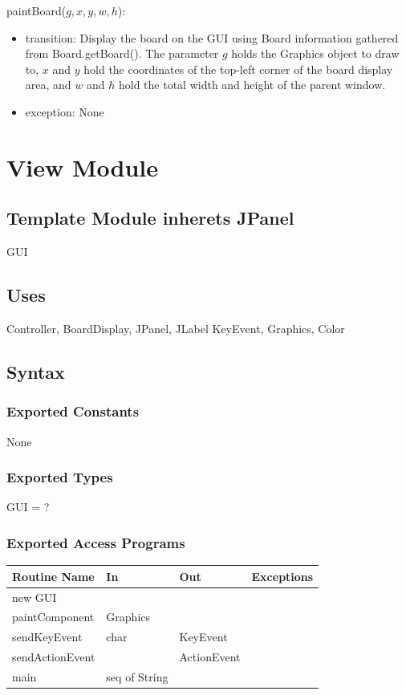 \documentclass{article}
\begin{document}
			\noindent paintBoard($g,x,y,w,h$):
			\begin{itemize}
				\item transition: Display the board on the GUI using Board information gathered from Board.getBoard(). The parameter $g$ holds the Graphics object to draw to, $x$ and $y$ hold the coordinates of the top-left corner of the board display area, and $w$ and $h$ hold the total width and height of the parent window.
				\item exception: None
			\end{itemize}


\newpage

\section*{View Module}
	
	\subsection*{Template Module inherets JPanel}
		GUI

	\subsection*{Uses}
		Controller, BoardDisplay, JPanel, JLabel KeyEvent, Graphics, Color

	\subsection*{Syntax}

		\subsubsection*{Exported Constants}
			None

		\subsubsection*{Exported Types}
			GUI = ?

		\subsubsection*{Exported Access Programs}
			\begin{tabular}{|l|l|l|p{5cm}|}
				\hline
				\textbf{Routine Name} & \textbf{In} & \textbf{Out} & \textbf{Exceptions} \\
				\hline
				new GUI & & & \\
				\hline
				paintComponent & Graphics & & \\
				\hline
				sendKeyEvent & char & KeyEvent & \\
				\hline
				sendActionEvent & & ActionEvent & \\
				\hline
				main & seq of String & & \\
				\hline
			\end{tabular}
\end{document}
